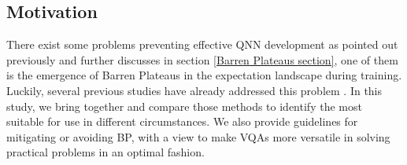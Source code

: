 \subsection{Motivation}
There exist some problems preventing effective QNN development as pointed out previously and further discusses in section \ref{Barren Plateaus section}, one of them is the emergence of Barren Plateaus in the expectation landscape during training.
Luckily, several previous studies have already addressed this problem \cite{cerezoCostFunctionDependent2021,skolikLayerwiseLearningQuantum2021,grantInitializationStrategyAddressing2019}.
In this study, we bring together and compare those methods to identify the most suitable for use in different circumstances.
We also provide guidelines for mitigating or avoiding BP, with a view to make VQAs more versatile in solving practical problems in an optimal fashion.